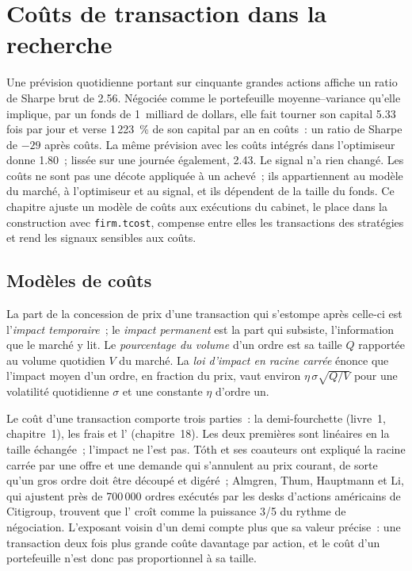 \chapter{Coûts de transaction dans la recherche}\label{ch:rs:transaction-costs-in-research}

Une prévision quotidienne portant sur cinquante grandes actions affiche un ratio de Sharpe brut de 2.56. Négociée comme le portefeuille moyenne--variance qu'elle implique, par un fonds de 1~milliard de dollars, elle fait tourner son capital
5.33 fois par jour et verse 1\,223~\% de son capital par an en coûts~: un ratio de Sharpe de $-29$ après coûts. La même prévision avec les coûts intégrés
dans l'optimiseur donne 1.80~; lissée sur une journée également, 2.43. Le signal n'a rien changé. Les coûts ne sont pas une décote appliquée à un  achevé~; ils appartiennent
au modèle du marché, à l'optimiseur et au signal, et ils dépendent de la taille du fonds. Ce chapitre ajuste un modèle de coûts aux exécutions du cabinet, le place
dans la construction avec \texttt{firm.tcost}, compense entre elles les transactions des stratégies et rend les signaux sensibles aux coûts.

\section{Modèles de coûts}

\begin{definition}\label{def:rs:transaction-costs-in-research:impact}
La part de la concession de prix d'une transaction qui s'estompe après celle-ci est l'\emph{impact temporaire}~; le \emph{impact
permanent} est la part qui subsiste, l'information que le marché y lit. Le \emph{pourcentage du volume}
d'un ordre est sa taille $Q$ rapportée au volume quotidien $V$ du marché. La \emph{loi d'impact en racine carrée} énonce que l'impact moyen d'un ordre, en fraction
du prix, vaut environ $\eta\,\sigma\sqrt{Q/V}$ pour une volatilité quotidienne $\sigma$ et une constante $\eta$ d'ordre un.
\end{definition}

Le coût d'une transaction comporte trois parties~: la demi-fourchette (livre~1, chapitre~1), les frais et l' (chapitre~18). Les deux premières sont linéaires en la taille échangée~;
l'impact ne l'est pas. Tóth et ses coauteurs ont expliqué la racine carrée par une offre et une demande qui s'annulent au prix courant, de sorte qu'un gros ordre doit être découpé et
digéré~; Almgren, Thum, Hauptmann et Li, qui ajustent près de 700\,000 ordres exécutés par les desks d'actions américains de Citigroup, trouvent que l' croît comme la puissance 3/5
du rythme de négociation. L'exposant voisin d'un demi compte plus que sa valeur précise~: une transaction deux fois plus grande coûte davantage par action, et le coût d'un portefeuille n'est donc pas
proportionnel à sa taille.

